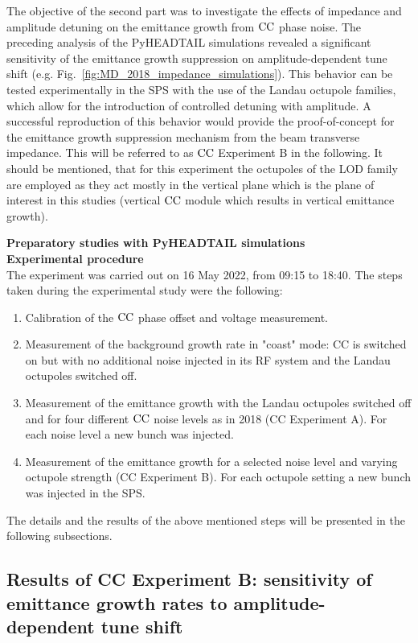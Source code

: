 The objective of the second part was to investigate the effects of impedance and amplitude detuning on the emittance growth from ${\mathrm{CC}}$ phase noise. The preceding analysis of the PyHEADTAIL simulations revealed a significant sensitivity of the emittance growth suppression on amplitude-dependent tune shift (e.g. Fig.~\ref{fig:MD_2018_impedance_simulations}). This behavior can be tested experimentally in the SPS with the use of the Landau octupole families, which allow for the introduction of controlled detuning with amplitude. A successful reproduction of this behavior would provide the proof-of-concept for the emittance growth suppression mechanism from the beam transverse impedance. This will be referred to as ${\mathrm{CC}}$ Experiment B in the following. It should be mentioned, that for this experiment the octupoles of the LOD family are employed as they act mostly in the vertical plane which is the plane of interest in this studies (vertical ${\mathrm{CC}}$ module which results in vertical emittance growth).

\textbf{Preparatory studies with PyHEADTAIL simulations}\\

\textbf{Experimental procedure}\\
The experiment was carried out on 16 May 2022, from 09:15 to 18:40. The steps taken during the experimental study were the following:

\begin{enumerate}
   \item Calibration of the ${\mathrm{CC}}$ phase offset and voltage measurement.
   \item Measurement of the background growth rate in "coast" mode: CC is switched on but with no additional noise injected in its RF system and the Landau octupoles switched off.
   \item Measurement of the emittance growth with the Landau octupoles switched off and for four different ${\mathrm{CC}}$ noise levels as in 2018 (CC Experiment A). For each noise level a new bunch was injected.
   \item Measurement of the emittance growth for a selected noise level and varying octupole strength (CC Experiment B). For each octupole setting a new bunch was injected in the SPS.
\end{enumerate}


The details and the results of the above mentioned steps will be presented in the following subsections.


\subsection{Results of CC Experiment B: sensitivity of emittance growth rates to amplitude-dependent tune shift}\label{subsec:cc_md_2022_octupole_scan}




